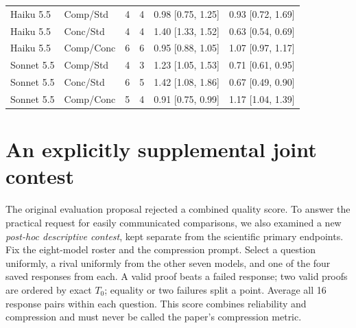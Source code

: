 \documentclass[11pt]{article}
\begin{document}
\begin{longtable}{llrrll}
Haiku 5.5 & Comp/Std & 4 & 4 & 0.98 [0.75, 1.25] & 0.93 [0.72, 1.69] \\
Haiku 5.5 & Conc/Std & 4 & 4 & 1.40 [1.33, 1.52] & 0.63 [0.54, 0.69] \\
Haiku 5.5 & Comp/Conc & 6 & 6 & 0.95 [0.88, 1.05] & 1.07 [0.97, 1.17] \\
Sonnet 5.5 & Comp/Std & 4 & 3 & 1.23 [1.05, 1.53] & 0.71 [0.61, 0.95] \\
Sonnet 5.5 & Conc/Std & 6 & 5 & 1.42 [1.08, 1.86] & 0.67 [0.49, 0.90] \\
Sonnet 5.5 & Comp/Conc & 5 & 4 & 0.91 [0.75, 0.99] & 1.17 [1.04, 1.39] \\
\bottomrule\end{longtable}\normalsize
\section{An explicitly supplemental joint contest}
\label{app:joint}
The original evaluation proposal rejected a combined quality score. To answer the practical request for easily communicated comparisons, we also examined a new \emph{post-hoc descriptive contest}, kept separate from the scientific primary endpoints. Fix the eight-model roster and the compression prompt. Select a question uniformly, a rival uniformly from the other seven models, and one of the four saved responses from each. A valid proof beats a failed response; two valid proofs are ordered by exact $T_0$; equality or two failures split a point. Average all 16 response pairs within each question. This score combines reliability and compression and must never be called the paper's compression metric.
\end{document}
